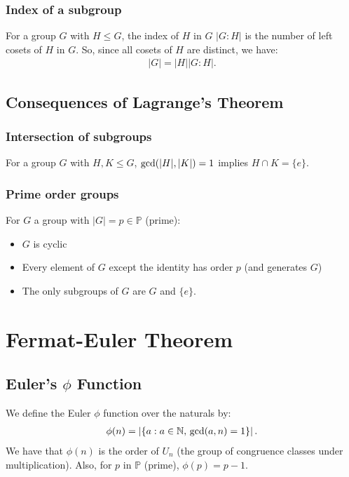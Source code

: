\documentclass[a4paper, 12pt, twoside]{article}
\begin{document}
\subsubsection{Index of a subgroup}

For a group $G$ with $H \leq G$, the index of $H$ in $G$
$|G : H|$ is the number of left cosets of $H$ in $G$. So, since
all cosets of $H$ are distinct, we have:
\begin{align*}
      |G| = |H||G : H|.
\end{align*}

\subsection{Consequences of Lagrange's Theorem}

\subsubsection{Intersection of subgroups}

For a group $G$ with $H, K \leq G$, $\operatorname{gcd}(|H|, |K|) = 1$ implies
$H \cap K = \{e\}$.

\subsubsection{Prime order groups}

For $G$ a group with $|G| = p \in \mathbb{P}$ (prime):

\begin{itemize}
      \item $G$ is cyclic
      \item Every element of $G$ except the identity has order $p$
            (and generates $G$)
      \item The only subgroups of $G$ are $G$ and $\{e\}$.
\end{itemize}

\section{Fermat-Euler Theorem}

\subsection{Euler's $\phi$ Function}

We define the Euler $\phi$ function over the naturals by:
\begin{align*}
      \phi(n) = \left|\{a : a \in \mathbb{N}, \, \operatorname{gcd}(a, n) = 1\}\right|.
\end{align*}
We have that $\phi(n)$ is the order of $U_n$ (the group of congruence
classes under multiplication). Also, for $p$ in $\mathbb{P}$ (prime),
$\phi(p) = p - 1$.
\end{document}
